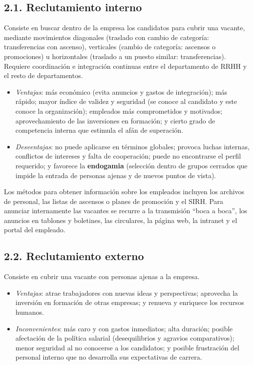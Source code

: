 \documentclass[12pt]{book} %
\providecommand{\tightlist}{%
  \setlength{\itemsep}{0pt}\setlength{\parskip}{0pt}}
\begin{document}
\hypertarget{reclutamiento-interno}{%
\subsection{2.1. Reclutamiento interno}\label{reclutamiento-interno}}

Consiste en buscar dentro de la empresa los candidatos para cubrir una
vacante, mediante movimientos diagonales (traslado con cambio de
categoría: transferencias con ascenso), verticales (cambio de categoría:
ascensos o promociones) u horizontales (traslado a un puesto similar:
transferencias). Requiere coordinación e integración continuas entre el
departamento de RRHH y el resto de departamentos.

\begin{itemize}
\tightlist
\item
  \emph{Ventajas}: más económico (evita anuncios y gastos de
  integración); más rápido; mayor índice de validez y seguridad (se
  conoce al candidato y este conoce la organización); empleados más
  comprometidos y motivados; aprovechamiento de las inversiones en
  formación; y cierto grado de competencia interna que estimula el afán
  de superación.
\item
  \emph{Desventajas}: no puede aplicarse en términos globales; provoca
  luchas internas, conflictos de intereses y falta de cooperación; puede
  no encontrarse el perfil requerido; y favorece la \textbf{endogamia}
  (selección dentro de grupos cerrados que impide la entrada de personas
  ajenas y de nuevos puntos de vista).
\end{itemize}

Los métodos para obtener información sobre los empleados incluyen los
archivos de personal, las listas de ascensos o planes de promoción y el
SIRH. Para anunciar internamente las vacantes se recurre a la
transmisión ``boca a boca'', los anuncios en tablones y boletines, las
circulares, la página web, la intranet y el portal del empleado.

\hypertarget{reclutamiento-externo}{%
\subsection{2.2. Reclutamiento externo}\label{reclutamiento-externo}}

Consiste en cubrir una vacante con personas ajenas a la empresa.

\begin{itemize}
\tightlist
\item
  \emph{Ventajas}: atrae trabajadores con nuevas ideas y perspectivas;
  aprovecha la inversión en formación de otras empresas; y renueva y
  enriquece los recursos humanos.
\item
  \emph{Inconvenientes}: más caro y con gastos inmediatos; alta
  duración; posible afectación de la política salarial (desequilibrios y
  agravios comparativos); menor seguridad al no conocerse a los
  candidatos; y posible frustración del personal interno que no
  desarrolla sus expectativas de carrera.
\end{itemize}
\end{document}

